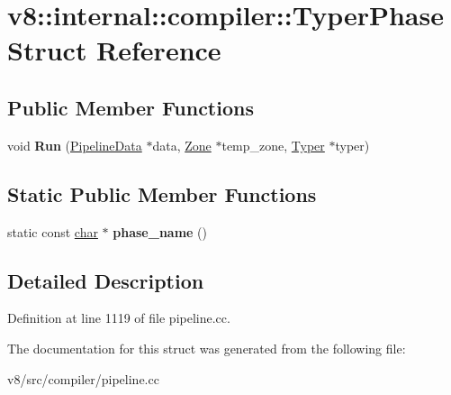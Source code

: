 \hypertarget{structv8_1_1internal_1_1compiler_1_1TyperPhase}{}\section{v8\+:\+:internal\+:\+:compiler\+:\+:Typer\+Phase Struct Reference}
\label{structv8_1_1internal_1_1compiler_1_1TyperPhase}
\subsection*{Public Member Functions}
\begin{DoxyCompactItemize}
\item 
\mbox{\label{structv8_1_1internal_1_1compiler_1_1TyperPhase_a1bc8b5908d828d140fb122ed7cbd50e6}} 
void {\bfseries Run} (\mbox{\hyperlink{classv8_1_1internal_1_1compiler_1_1PipelineData}{Pipeline\+Data}} $\ast$data, \mbox{\hyperlink{classv8_1_1internal_1_1Zone}{Zone}} $\ast$temp\+\_\+zone, \mbox{\hyperlink{classv8_1_1internal_1_1compiler_1_1Typer}{Typer}} $\ast$typer)
\end{DoxyCompactItemize}
\subsection*{Static Public Member Functions}
\begin{DoxyCompactItemize}
\item 
\mbox{\label{structv8_1_1internal_1_1compiler_1_1TyperPhase_ac4354c06296428a0dae91e5259e25d6a}} 
static const \mbox{\hyperlink{classchar}{char}} $\ast$ {\bfseries phase\+\_\+name} ()
\end{DoxyCompactItemize}


\subsection{Detailed Description}


Definition at line 1119 of file pipeline.\+cc.



The documentation for this struct was generated from the following file\+:\begin{DoxyCompactItemize}
\item 
v8/src/compiler/pipeline.\+cc\end{DoxyCompactItemize}
